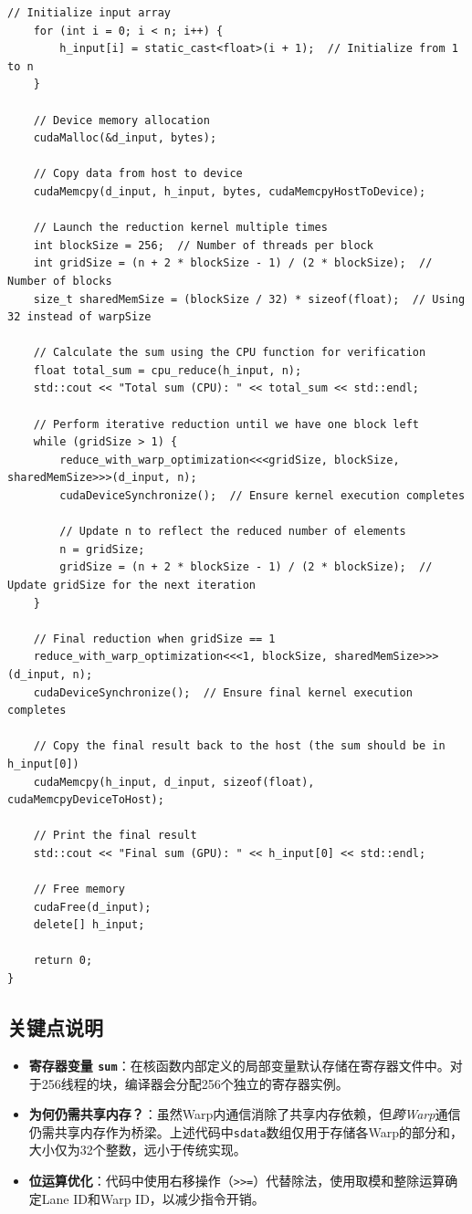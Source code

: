 \begin{lstlisting}[caption={Shuffle-based Reduction Kernel}]
    // Initialize input array
    for (int i = 0; i < n; i++) {
        h_input[i] = static_cast<float>(i + 1);  // Initialize from 1 to n
    }

    // Device memory allocation
    cudaMalloc(&d_input, bytes);

    // Copy data from host to device
    cudaMemcpy(d_input, h_input, bytes, cudaMemcpyHostToDevice);

    // Launch the reduction kernel multiple times
    int blockSize = 256;  // Number of threads per block
    int gridSize = (n + 2 * blockSize - 1) / (2 * blockSize);  // Number of blocks
    size_t sharedMemSize = (blockSize / 32) * sizeof(float);  // Using 32 instead of warpSize

    // Calculate the sum using the CPU function for verification
    float total_sum = cpu_reduce(h_input, n);
    std::cout << "Total sum (CPU): " << total_sum << std::endl;

    // Perform iterative reduction until we have one block left
    while (gridSize > 1) {
        reduce_with_warp_optimization<<<gridSize, blockSize, sharedMemSize>>>(d_input, n);
        cudaDeviceSynchronize();  // Ensure kernel execution completes

        // Update n to reflect the reduced number of elements
        n = gridSize;
        gridSize = (n + 2 * blockSize - 1) / (2 * blockSize);  // Update gridSize for the next iteration
    }

    // Final reduction when gridSize == 1
    reduce_with_warp_optimization<<<1, blockSize, sharedMemSize>>>(d_input, n);
    cudaDeviceSynchronize();  // Ensure final kernel execution completes

    // Copy the final result back to the host (the sum should be in h_input[0])
    cudaMemcpy(h_input, d_input, sizeof(float), cudaMemcpyDeviceToHost);

    // Print the final result
    std::cout << "Final sum (GPU): " << h_input[0] << std::endl;

    // Free memory
    cudaFree(d_input);
    delete[] h_input;

    return 0;
}
\end{lstlisting}

\subsection{关键点说明}
\begin{itemize}
    \item \textbf{寄存器变量 \texttt{sum}}：在核函数内部定义的局部变量默认存储在寄存器文件中。对于256线程的块，编译器会分配256个独立的寄存器实例。
    \item \textbf{为何仍需共享内存？}：虽然Warp内通信消除了共享内存依赖，但\textit{跨Warp}通信仍需共享内存作为桥梁。上述代码中\texttt{sdata}数组仅用于存储各Warp的部分和，大小仅为32个整数，远小于传统实现。
    \item \textbf{位运算优化}：代码中使用右移操作（\texttt{>>=}）代替除法，使用取模和整除运算确定Lane ID和Warp ID，以减少指令开销。
\end{itemize}

